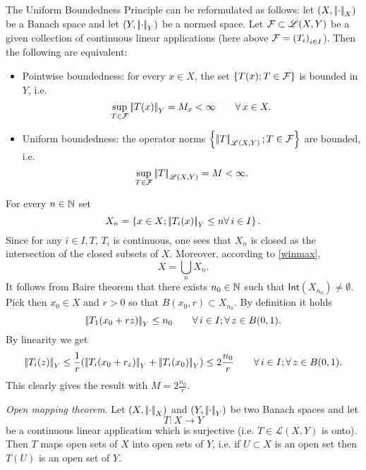 \documentclass{article}
\begin{document}
The Uniform Boundedness Principle can be reformulated as follows: let $\left(X,\left|\negthinspace\left|\cdot\right|\negthinspace\right|_{X}\right)$ be a Banach space and let $\left(Y,\left|\negthinspace\left|\cdot\right|\negthinspace\right|_{Y}\right)$ be a normed space. Let $\mathcal{F}\subset\mathscr{L}(X,Y)$ be a given collection of continuous linear applications (here above $\mathcal{F}={\left(T_{i}\right)}_{i\in I}$). Then the following are equivalent:
\begin{itemize}
	\item Pointwise boundedness: for every $x\in X$, the set $\left\{T(x);T\in\mathcal{F}\right\}$ is bounded in $Y$, i.e.
	\begin{equation*}
		\sup_{T\in\mathcal{F}}\left|\negthinspace\left|T(x)\right|\negthinspace\right|_{Y}=M_{x}<\infty\qquad\forall\, x\in X.
	\end{equation*}
	\item Uniform boundedness: the operator norms $\left\{\left|\negthinspace\left|T\right|\negthinspace\right|_{\mathscr{L}(X,Y)};T\in\mathcal{F}\right\}$ are bounded, i.e.
	\begin{equation*}
		\sup_{T\in\mathcal{F}}\left|\negthinspace\left|T\right|\negthinspace\right|_{\mathscr{L}(X,Y)}=M<\infty.
	\end{equation*}
\end{itemize}
\begin{fancyproof}
	For every $n\in\mathbb{N}$ set
	\begin{equation*}
		X_{n}=\left\{x\in X;\left|\negthinspace\left|T_{i}(x)\right|\negthinspace\right|_{Y}\leq n\forall\, i\in I\right\}.
	\end{equation*}
	Since for any $i\in I,T$, $T_{i}$ is continuous, one sees that $X_{n}$ is closed as the intersection of the closed subsets of $X$. Moreover, according to \ref{winmax},
	\begin{equation*}
		X=\bigcup_{n}X_{n}.
	\end{equation*}
	It follows from Baire theorem that there exists $n_{0}\in\mathbb{N}$ such that $\mathsf{Int}\left(X_{n_{0}}\right)\neq\emptyset$. Pick then $x_{0}\in X$ and $r>0$ so that $B(x_{0},r)\subset X_{n_{0}}$. By definition it holds
	\begin{equation*}
		\left|\negthinspace\left|T_{1}(x_{0}+rz)\right|\negthinspace\right|_{Y}\leq n_{0}\qquad\forall\, i\in I;\forall\, z\in B(0,1).
	\end{equation*}
	By linearity we get
	\begin{equation*}
		\left|\negthinspace\left|T_{i}(z)\right|\negthinspace\right|_{Y}\leq\frac{1}{r}(\left|\negthinspace\left|T_{i}(x_{0}+r_{z})\right|\negthinspace\right|_{Y}+\left|\negthinspace\left|T_{i}(x_{0})\right|\negthinspace\right|_{Y})\leq 2\frac{n_{0}}{r}\qquad\forall\, i\in I;\forall\, z\in B(0,1).
	\end{equation*}
	This clearly gives the result with $M=2\frac{n_{0}}{r}$.
\end{fancyproof}
\begin{theorem}
	\emph{Open mapping theorem}. Let $\left(X,\left|\negthinspace\left|\cdot\right|\negthinspace\right|_{X}\right)$ and $\left(Y,\left|\negthinspace\left|\cdot\right|\negthinspace\right|_{Y}\right)$ be two Banach spaces and let 
	\begin{equation*}
		T:X\to Y
	\end{equation*}
	be a continuous linear application which is surjective (i.e. $T\in\mathscr{L}(X,Y)$ is onto). Then $T$ maps open sets of $X$ into open sets of $Y$, i.e. if $U\subset X$ is an open set then $T(U)$ is an open set of $Y$.
\end{theorem}
\end{document}
